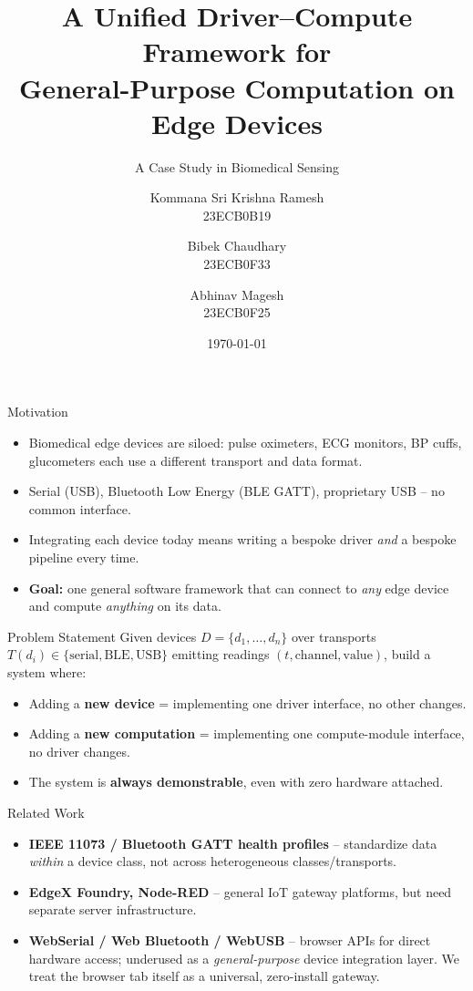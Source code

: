 \documentclass{beamer}
\title[Edge Device Gateway]{A Unified Driver--Compute Framework for\\General-Purpose Computation on Edge Devices}
\subtitle{A Case Study in Biomedical Sensing}
\author{%
  \begin{tabular}[t]{c}Kommana Sri Krishna Ramesh\\[2pt]\footnotesize 23ECB0B19\end{tabular}
  \and
  \begin{tabular}[t]{c}Bibek Chaudhary\\[2pt]\footnotesize 23ECB0F33\end{tabular}
  \and
  \begin{tabular}[t]{c}Abhinav Magesh\\[2pt]\footnotesize 23ECB0F25\end{tabular}
}
\institute{Team B19}
\date{\today}
\begin{document}
\frame{\titlepage}

\begin{frame}{Motivation}
\begin{itemize}
  \item Biomedical edge devices are siloed: pulse oximeters, ECG monitors, BP cuffs,
    glucometers each use a different transport and data format.
  \item Serial (USB), Bluetooth Low Energy (BLE GATT), proprietary USB -- no common interface.
  \item Integrating each device today means writing a bespoke driver \emph{and} a bespoke
    pipeline every time.
  \item \textbf{Goal:} one general software framework that can connect to \emph{any} edge
    device and compute \emph{anything} on its data.
\end{itemize}
\end{frame}

\begin{frame}{Problem Statement}
Given devices $D=\{d_1,\dots,d_n\}$ over transports $T(d_i)\in\{\text{serial},\text{BLE},\text{USB}\}$
emitting readings $(t, \text{channel}, \text{value})$, build a system where:
\begin{itemize}
  \item Adding a \textbf{new device} = implementing one driver interface, no other changes.
  \item Adding a \textbf{new computation} = implementing one compute-module interface, no
    driver changes.
  \item The system is \textbf{always demonstrable}, even with zero hardware attached.
\end{itemize}
\end{frame}

\begin{frame}{Related Work}
\begin{itemize}
  \item \textbf{IEEE 11073 / Bluetooth GATT health profiles} -- standardize data \emph{within}
    a device class, not across heterogeneous classes/transports.
  \item \textbf{EdgeX Foundry, Node-RED} -- general IoT gateway platforms, but need separate
    server infrastructure.
  \item \textbf{WebSerial / Web Bluetooth / WebUSB} -- browser APIs for direct hardware access;
    underused as a \emph{general-purpose} device integration layer. We treat the browser tab
    itself as a universal, zero-install gateway.
\end{itemize}
\end{frame}
\end{document}
